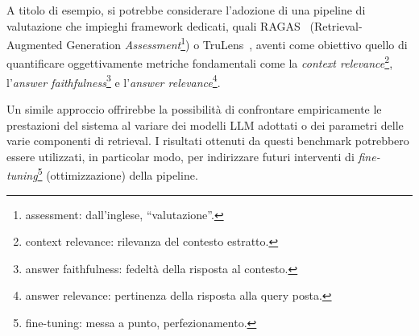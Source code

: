 A titolo di esempio, si potrebbe considerare l'adozione di una pipeline di valutazione che impieghi framework dedicati, quali RAGAS~\cite{ragas_docs} (Retrieval-Augmented Generation \textit{Assessment}\footnote{assessment: dall'inglese, ``valutazione''.}) o TruLens~\cite{trulens_docs}, aventi come obiettivo quello di quantificare oggettivamente metriche fondamentali come la \textit{context relevance}\footnote{context relevance: rilevanza del contesto estratto.}, l'\textit{answer faithfulness}\footnote{answer faithfulness: fedeltà della risposta al contesto.} e l'\textit{answer relevance}\footnote{answer relevance: pertinenza della risposta alla query posta.}. 

Un simile approccio offrirebbe la possibilità di confrontare empiricamente le prestazioni del sistema al variare dei modelli LLM adottati o dei parametri delle varie componenti di retrieval. I risultati ottenuti da questi benchmark potrebbero essere utilizzati, in particolar modo, per indirizzare futuri interventi di \textit{fine-tuning}\footnote{fine-tuning: messa a punto, perfezionamento.} (ottimizzazione) della pipeline.
